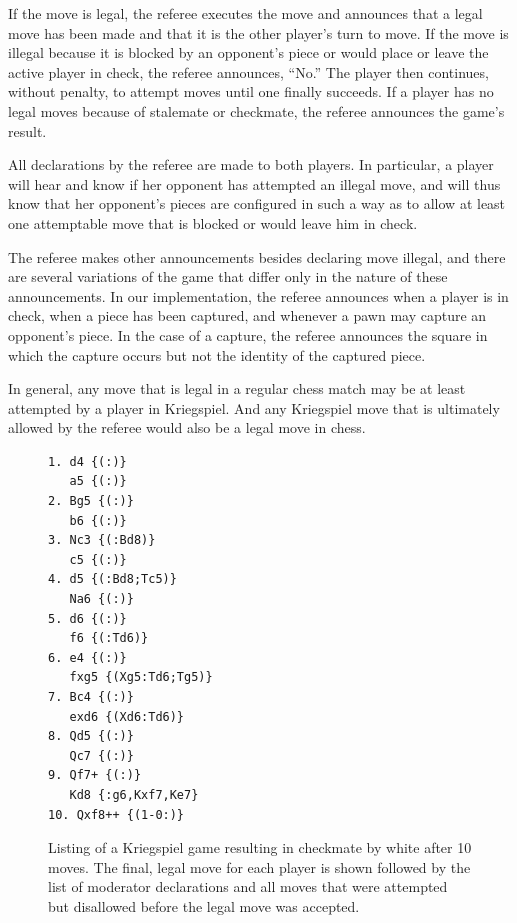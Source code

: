 \documentclass[10pt, conference, compsocconf]{IEEEtran}
\begin{document}
If the move is legal, the referee executes the move and announces that a
legal move has been made and that it is the other player's turn to move.  If
the move is illegal because it is blocked by an opponent's piece or would place
or leave the active player in check, the referee announces, ``No.''  The player
then continues, without penalty, to attempt moves until one finally succeeds.
If a player has no legal moves because of stalemate or checkmate, the referee
announces the game's result.

All declarations by the referee are made to both players.  In
particular, a player will hear and know if her opponent has attempted an
illegal move, and will thus know that her opponent's pieces are configured in
such a way as to allow at least one attemptable move that is blocked or would
leave him in check.  

The referee makes other announcements besides declaring move illegal, and there
are several variations of the game that differ only in the nature of these
announcements.  In our implementation, the referee announces when a player is
in check, when a piece has been captured, and whenever a pawn may capture an
opponent's piece.  In the case of a capture, the referee announces the square
in which the capture occurs but not the identity of the captured piece.

In general, any move that is legal in a regular chess match may be at least
attempted by a player in Kriegspiel.  And any Kriegspiel move that is
ultimately allowed by the referee would also be a legal move in chess.    

\begin{figure}
\begin{center}
\begin{verbatim}
1. d4 {(:)}
   a5 {(:)}
2. Bg5 {(:)}
   b6 {(:)}
3. Nc3 {(:Bd8)}
   c5 {(:)}
4. d5 {(:Bd8;Tc5)}
   Na6 {(:)}
5. d6 {(:)}
   f6 {(:Td6)}
6. e4 {(:)}
   fxg5 {(Xg5:Td6;Tg5)}
7. Bc4 {(:)}
   exd6 {(Xd6:Td6)}
8. Qd5 {(:)}
   Qc7 {(:)}
9. Qf7+ {(:)} 
   Kd8 {:g6,Kxf7,Ke7}
10. Qxf8++ {(1-0:)}
\end{verbatim}
\end{center}
\caption{Listing of a Kriegspiel game resulting in checkmate by white after 10 moves. The final, legal move for each player is shown followed by the list of moderator declarations and all moves that were attempted but disallowed before the legal move was accepted.}
\label{listing}
\end{figure}
\end{document}
